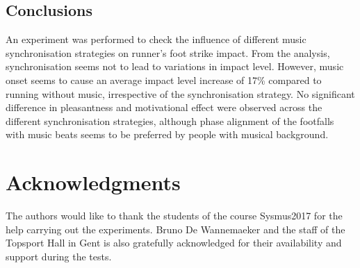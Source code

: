 \documentclass[10pt,letterpaper]{article}
\begin{document}
\subsection*{Conclusions}

An experiment was performed to check the influence of different music synchronisation strategies on runner's foot strike impact. From the analysis, synchronisation seems not to lead to variations in impact level. However, music onset seems to cause an average impact level increase of 17\% compared to running without music, irrespective of the synchronisation strategy.
No significant difference in pleasantness and motivational effect were observed across the different synchronisation strategies, although phase alignment of the footfalls with music beats seems to be preferred by people with musical background. 



\section*{Acknowledgments}
The authors would like to thank the students of the course Sysmus2017 for the help carrying out the experiments. Bruno De Wannemaeker and the staff of the Topsport Hall in Gent is also gratefully acknowledged for their availability and support during the tests.
\nolinenumbers

%
%
% 



\end{document}
